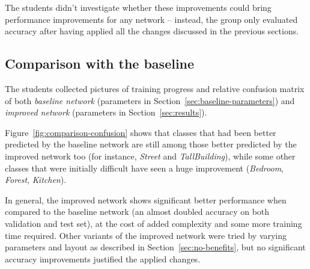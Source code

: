 \documentclass[a4paper, 11pt]{article} %
\begin{document}
The students didn't investigate whether these improvements could bring performance improvements for any network \--- instead, the group only evaluated accuracy after having applied all the changes discussed in the previous sections.


\subsection{Comparison with the baseline}\label{sec:baseline-comparison}

The students collected pictures of training progress and relative confusion matrix of both \emph{baseline network} (parameters in Section~\ref{sec:baseline-parameters}) and \emph{improved network} (parameters in Section~\ref{sec:results}).

Figure~\ref{fig:comparison-confusion} shows that classes that had been better predicted by the baseline network are still among those better predicted by the improved network too (for instance, \emph{Street} and \emph{TallBuilding}), while some other classes that were initially difficult have seen a huge improvement (\emph{Bedroom}, \emph{Forest}, \emph{Kitchen}).

In general, the improved network shows significant better performance when compared to the baseline network (an almost doubled accuracy on both validation and test set), at the cost of added complexity and some more training time required. Other variants of the improved network were tried by varying parameters and layout as described in Section~\ref{sec:no-benefits}, but no significant accuracy improvements justified the applied changes.
\end{document}
